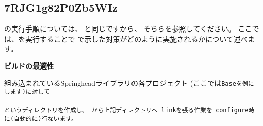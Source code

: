 \subsection{7RJG1g82P0Zb5WIz}
\label{subsec:CmakeApplication}

\noindent
\cmake \KLUDGE の実行手順については、
\KLUDGE と同じですから、
\KLUDGE そちらを参照してください。
\KLUDGE ここでは、\cmake \KLUDGE を実行することで
\KLUDGE で示した対策がどのように実施されるかについて述べます。

\bigskip
\noindent
\bf{\KLUDGE ビルドの最適性}
\begin{narrow}[20pt]
	\KLUDGE 組み込まれているSpringhead\KLUDGE ライブラリの各プロジェクト
	(\KLUDGE ここでは\tt{Base}\KLUDGE を例にします)\KLUDGE に対して\\
	\hspace{20pt}\\
	\KLUDGE というディレクトリを作成し、
	\KLUDGE から上記ディレクトリ\KLUDGE へ
	link\KLUDGE を張る作業を\cmake\ configure\KLUDGE 時に(\KLUDGE 自動的に)\KLUDGE 行ないます。
\end{narrow}	
